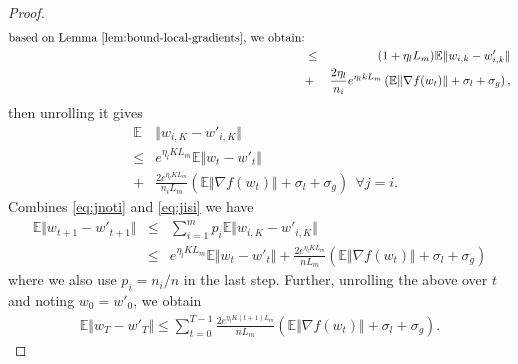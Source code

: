 \begin{proof}
\begin{eqnarray}
        \text{based on Lemma \ref{lem:bound-local-gradients}, we obtain:}\nonumber\\
        &\le& (1 + \eta_l L_m )\mathbb{E}\Vert w_{i,k} - w'_{i,k} \Vert \nonumber\\
        &+& \frac{2\eta_l}{n_i}e^{\eta_l kL_m}\left( \mathbb{E}\Vert \nabla f(w_t) \Vert +\sigma_{l} + \sigma_{g} \right),   \nonumber
    \end{eqnarray}
    then unrolling it gives
    \begin{eqnarray}    \label{eq:jisi}
        &\mathbb{E}&\Vert w_{i,K} - w'_{i,K} \Vert \nonumber\\
        &\le& e^{\eta_l KL_m}\mathbb{E}\Vert w_t - w'_t \Vert \nonumber\\
        & +& \frac{2e^{\eta_l KL_m}}{n_i L_m}\left( \mathbb{E}\Vert \nabla f(w_t) \Vert +\sigma_{l} + \sigma_{g} \right) ~~ \forall j = i. 
    \end{eqnarray}
    Combines \ref{eq:jnoti} and \ref{eq:jisi} we have
    \begin{eqnarray}
        \mathbb{E}\Vert w_{t+1} - w'_{t+1} \Vert 
        &\le& \sum_{i=1}^m p_i \mathbb{E}\Vert w_{i,K} - w'_{i,K} \Vert  \nonumber \\
        &\le& e^{\eta_l KL_m}\mathbb{E}\Vert w_t - w'_t \Vert+\frac{2e^{\eta_l KL_m}}{n L_m}\left( \mathbb{E}\Vert \nabla f(w_t) \Vert +\sigma_{l} + \sigma_{g} \right) \nonumber
    \end{eqnarray}
    where we also use $p_i = n_i/n$ in the last step. Further, unrolling the above over $t$ and noting $w_0 = w'_0$, we obtain
    \begin{eqnarray}
        \mathbb{E}\Vert w_T - w'_T \Vert \le \sum_{t=0}^{T-1} \frac{2e^{\eta_lK(t+1) L_m}}{n L_m}\left( \mathbb{E}\Vert \nabla f(w_t) \Vert +\sigma_{l} + \sigma_{g} \right).  \nonumber
    \end{eqnarray}
\end{proof}

